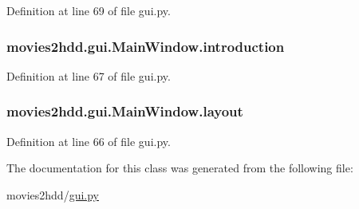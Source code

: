 Definition at line 69 of file gui.\-py.

\hypertarget{classmovies2hdd_1_1gui_1_1_main_window_a26535b6fc26552cfc8ca56beb4d4cce7}{
\subsubsection[{introduction}]{\setlength{\rightskip}{0pt plus 5cm}movies2hdd.\-gui.\-Main\-Window.\-introduction}}\label{classmovies2hdd_1_1gui_1_1_main_window_a26535b6fc26552cfc8ca56beb4d4cce7}


Definition at line 67 of file gui.\-py.

\hypertarget{classmovies2hdd_1_1gui_1_1_main_window_a33aed6a40173ad6916d4c0682d204b3a}{
\subsubsection[{layout}]{\setlength{\rightskip}{0pt plus 5cm}movies2hdd.\-gui.\-Main\-Window.\-layout}}\label{classmovies2hdd_1_1gui_1_1_main_window_a33aed6a40173ad6916d4c0682d204b3a}


Definition at line 66 of file gui.\-py.



The documentation for this class was generated from the following file\-:\begin{DoxyCompactItemize}
\item 
movies2hdd/\hyperlink{gui_8py}{gui.\-py}\end{DoxyCompactItemize}
